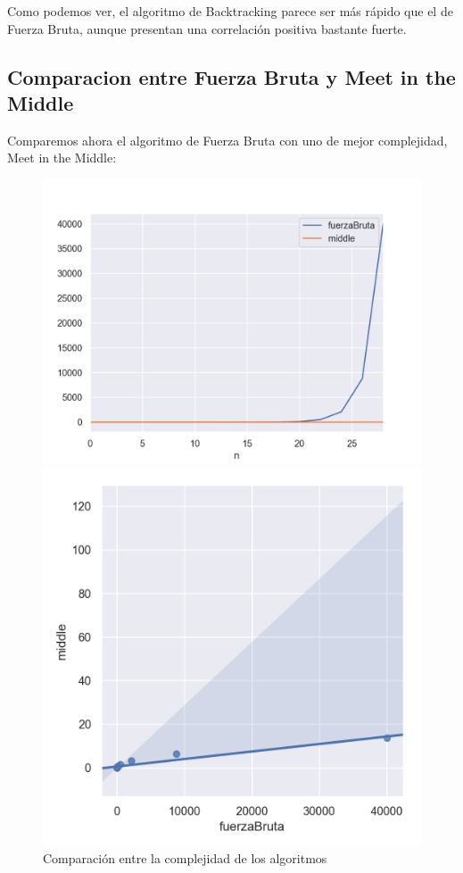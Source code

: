 Como podemos ver, el algoritmo de Backtracking parece ser más rápido que el de Fuerza Bruta, aunque presentan una correlación positiva bastante fuerte.

\subsection*{Comparacion entre Fuerza Bruta y Meet in the Middle}
Comparemos ahora el algoritmo de Fuerza Bruta con uno de  mejor complejidad, Meet in the Middle:

\begin{figure}[H]
   \begin{minipage}{0.5\textwidth}
     \centering
     \includegraphics[width=1\linewidth]{img/fb_vs_middle_1}
     \caption{Comparación entre la complejidad de los algoritmos}
   \end{minipage}\hfill
   \begin{minipage}{0.5\textwidth}
     \centering
     \includegraphics[width=1\linewidth]{img/fb_vs_middle_2}

\end{minipage}
\end{figure}
